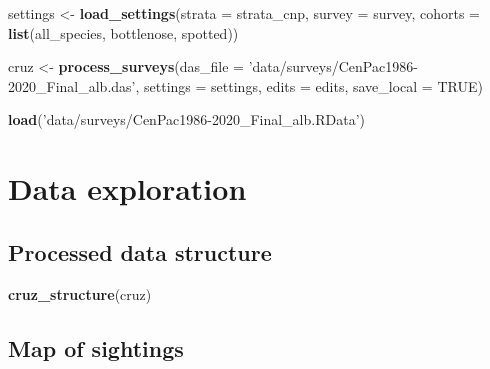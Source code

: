 \documentclass[
]{book}
\newenvironment{Shaded}{\begin{snugshade}}{\end{snugshade}}
\newcommand{\DataTypeTok}[1]{\textcolor[rgb]{0.13,0.29,0.53}{#1}}
\newcommand{\KeywordTok}[1]{\textcolor[rgb]{0.13,0.29,0.53}{\textbf{#1}}}
\newcommand{\NormalTok}[1]{#1}
\newcommand{\OtherTok}[1]{\textcolor[rgb]{0.56,0.35,0.01}{#1}}
\newcommand{\StringTok}[1]{\textcolor[rgb]{0.31,0.60,0.02}{#1}}
\begin{document}
\begin{Shaded}
\begin{Highlighting}[]
\NormalTok{settings <-}\StringTok{ }\KeywordTok{load_settings}\NormalTok{(}\DataTypeTok{strata =}\NormalTok{ strata_cnp,}
                          \DataTypeTok{survey =}\NormalTok{ survey,}
                          \DataTypeTok{cohorts =} \KeywordTok{list}\NormalTok{(all_species,}
\NormalTok{                                         bottlenose,}
\NormalTok{                                         spotted))}

\NormalTok{cruz <-}\StringTok{ }
\StringTok{  }\KeywordTok{process_surveys}\NormalTok{(}\DataTypeTok{das_file =} \StringTok{'data/surveys/CenPac1986-2020_Final_alb.das'}\NormalTok{,}
                  \DataTypeTok{settings =}\NormalTok{ settings,}
                  \DataTypeTok{edits =}\NormalTok{ edits,}
                  \DataTypeTok{save_local =} \OtherTok{TRUE}\NormalTok{) }
\end{Highlighting}
\end{Shaded}

\begin{Shaded}
\begin{Highlighting}[]
\KeywordTok{load}\NormalTok{(}\StringTok{'data/surveys/CenPac1986-2020_Final_alb.RData'}\NormalTok{)}
\end{Highlighting}
\end{Shaded}

\hypertarget{data-exploration-1}{%
\section*{Data exploration}\label{data-exploration-1}}

\hypertarget{processed-data-structure-1}{%
\subsection*{Processed data structure}\label{processed-data-structure-1}}

\begin{Shaded}
\begin{Highlighting}[]
\KeywordTok{cruz_structure}\NormalTok{(cruz)}
\end{Highlighting}
\end{Shaded}

\hypertarget{map-of-sightings-1}{%
\subsection*{Map of sightings}\label{map-of-sightings-1}}
\end{document}
